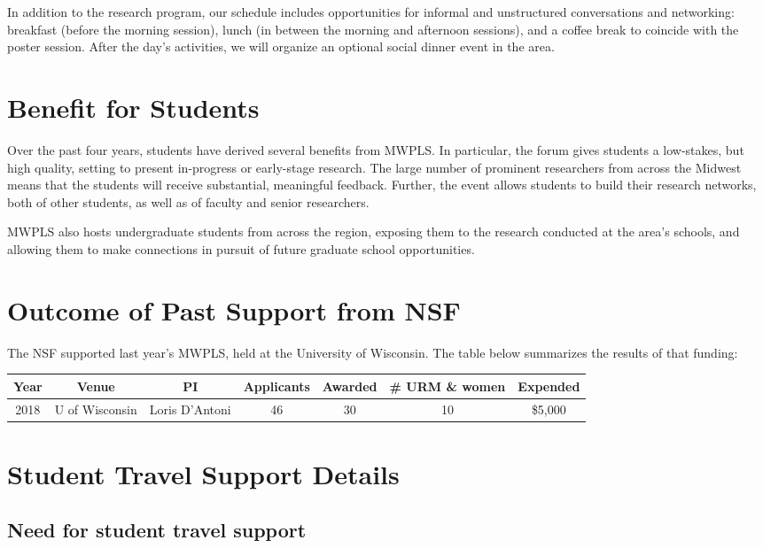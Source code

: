 \documentclass[11pt]{article}
\begin{document}
In addition to the research program, our schedule includes
opportunities for informal and unstructured conversations and
networking: breakfast (before the morning session), lunch (in between
the morning and afternoon sessions), and a coffee break to coincide
with the poster session. After the day's activities, we will organize
an optional social dinner event in the area.

\section{Benefit for Students}

Over the past four years, students have derived several benefits from MWPLS. In particular, the forum gives students a low-stakes, but high quality, setting to present in-progress or early-stage research. The large number of prominent researchers from across the Midwest means that the students will receive substantial, meaningful feedback. Further, the event allows students to build their research networks, both of other students, as well as of faculty and senior researchers.

MWPLS also hosts undergraduate students from across the region, exposing them to the research conducted at the area's schools, and allowing them to make connections in pursuit of future graduate school opportunities.

\section{Outcome of Past Support from NSF}

The NSF supported last year's MWPLS, held at the University of Wisconsin. The table below summarizes the results of that funding:

\noindent
\begin{tabular}{ccccccc}
	Year & Venue & PI & Applicants & Awarded & \# URM \& women & Expended \\
	\hline
	2018 & U of Wisconsin & Loris D'Antoni & 46 & 30 & 10 & \$5,000 \\
\end{tabular}

\section{Student Travel Support Details}

\subsection{Need for student travel support}
\end{document}
